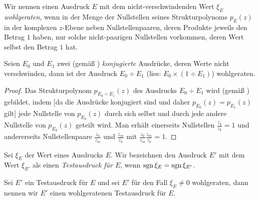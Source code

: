 \begin{definition}
Wir nennen einen Ausdruck $E$ 
mit dem nicht-verschwindenden Wert $\xi_E$ {\em wohlgeraten},
wenn in der Menge der Nullstellen
seines Strukturpolynoms $p_E(z)$
in der komplexen $z$-Ebene 
neben Nullstellenpaaren, 
deren Produkte jeweils den Betrag $1$ haben,
nur solche nicht-paarigen Nullstellen vorkommen,
deren Wert selbst den Betrag $1$ hat.
\end{definition}


\begin{theorem}[Hauptsatz]\label{th:Hauptsatz}
Seien $E_0$ und $E_1$ zwei 
(gemäß )
{\em konjugierte} Ausdrücke,
deren Werte nicht verschwinden,
dann ist der Ausdruck
$E_0\div E_1$ (lies: $E_0\times(1 \div E_1)$) wohlgeraten.
\begin{proof}
Das Strukturpolynom $p_{E_0\div E_1}(z)$
des Ausdrucks $E_0\div E_1$ wird 
(gemäß ) gebildet,
indem [da die Ausdrücke konjugiert sind 
und daher $p_{E_0}(z)=p_{E_1}(z)$ gilt]
jede Nullstelle von $p_{E_0}(z)$
durch sich selbst und durch 
jede andere Nullstelle von $p_{E_0}(z)$
geteilt wird.
Man erhält einerseits Nullstellen $\frac{z_{k}}{z_{k}}=1$
und andererseits Nullstellenpaare
$\frac{z_{k}}{z_{m}}$ und $\frac{z_{m}}{z_{k}}$
mit $\frac{z_{k}}{z_{m}}\frac{z_{m}}{z_{k}}=1$.
\end{proof}
\end{theorem}


\begin{definition}[Testausdruck]\label{de:Testausdruck}
Sei $\xi_E$ der Wert eines Ausdrucks $E$.
Wir bezeichnen den Ausdruck $E'$ mit dem Wert $\xi_{E'}$
als einen {\em Testausdruck für $E$},
wenn $\operatorname{sgn}\xi_E = \operatorname{sgn}\xi_{E'}$.
\end{definition}


\begin{definition}
Sei $E'$ ein Testausdruck für $E$
und sei $E'$ für den Fall $\xi_E\ne 0$ wohlgeraten,
dann nennen wir $E'$ einen wohlgeratenen Testausdruck für $E$.
\end{definition}


